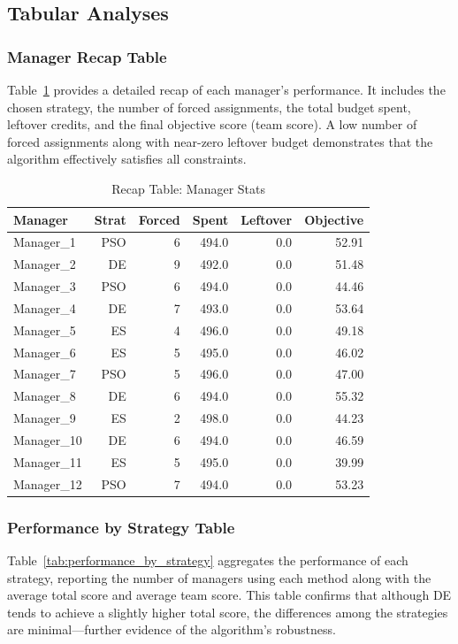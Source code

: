 \documentclass[sigconf]{acmart}
\begin{document}
\subsection{Tabular Analyses}

\subsubsection{Manager Recap Table}
Table~\ref{tab:recap_manager} provides a detailed recap of each manager's performance. It includes the chosen strategy, the number of forced assignments, the total budget spent, leftover credits, and the final objective score (team score). A low number of forced assignments along with near-zero leftover budget demonstrates that the algorithm effectively satisfies all constraints.

\begin{table}[H]
	\centering
	\caption{Recap Table: Manager Stats}
	\label{tab:recap_manager}
	\begin{tabular}{lrrrrr}
		\toprule
		\textbf{Manager} & \textbf{Strat} & \textbf{Forced} & \textbf{Spent} & \textbf{Leftover} & \textbf{Objective} \\
		\midrule
		Manager\_1  & PSO & 6 & 494.0 & 0.0 & 52.91 \\
		Manager\_2  & DE  & 9 & 492.0 & 0.0 & 51.48 \\
		Manager\_3  & PSO & 6 & 494.0 & 0.0 & 44.46 \\
		Manager\_4  & DE  & 7 & 493.0 & 0.0 & 53.64 \\
		Manager\_5  & ES  & 4 & 496.0 & 0.0 & 49.18 \\
		Manager\_6  & ES  & 5 & 495.0 & 0.0 & 46.02 \\
		Manager\_7  & PSO & 5 & 496.0 & 0.0 & 47.00 \\
		Manager\_8  & DE  & 6 & 494.0 & 0.0 & 55.32 \\
		Manager\_9  & ES  & 2 & 498.0 & 0.0 & 44.23 \\
		Manager\_10 & DE  & 6 & 494.0 & 0.0 & 46.59 \\
		Manager\_11 & ES  & 5 & 495.0 & 0.0 & 39.99 \\
		Manager\_12 & PSO & 7 & 494.0 & 0.0 & 53.23 \\
		\bottomrule
	\end{tabular}
\end{table}

\subsubsection{Performance by Strategy Table}
Table~\ref{tab:performance_by_strategy} aggregates the performance of each strategy, reporting the number of managers using each method along with the average total score and average team score. This table confirms that although DE tends to achieve a slightly higher total score, the differences among the strategies are minimal—further evidence of the algorithm's robustness.
\end{document}
